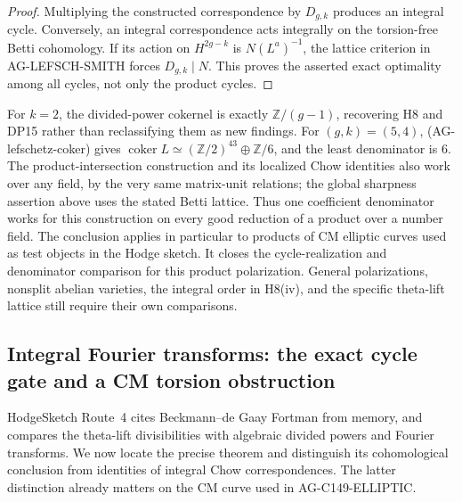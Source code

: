 \begin{proof}
Multiplying the constructed correspondence by $D_{g,k}$
produces an integral cycle.  Conversely, an integral
correspondence acts integrally on the torsion-free Betti
cohomology.  If its action on $H^{2g-k}$ is
$N(L^a)^{-1}$, the lattice criterion in AG-LEFSCH-SMITH
forces $D_{g,k}\mid N$.  This proves the asserted exact
optimality among all cycles, not only the product cycles.
\end{proof}

For $k=2$, the divided-power cokernel is exactly
$\mathbb Z/(g-1)$, recovering H8 and DP15 rather than
reclassifying them as new findings.  For $(g,k)=(5,4)$,
(AG-lefschetz-coker) gives
$\operatorname{coker} L\simeq(\mathbb Z/2)^{43}\oplus
\mathbb Z/6$, and the least denominator is $6$.
The product-intersection construction and its localized Chow
identities also work over any field, by the very same matrix-unit
relations; the global sharpness assertion above uses the stated
Betti lattice.  Thus one coefficient denominator works for this
construction on every good reduction of a product over a number
field.  The conclusion applies in particular to products
of CM elliptic curves used as test objects in the Hodge
sketch.  It closes the cycle-realization and denominator
comparison for this product polarization.  General
polarizations, nonsplit abelian varieties, the integral
order in H8(iv), and the specific theta-lift lattice still
require their own comparisons.


\subsection{Integral Fourier transforms: the exact cycle gate and a CM torsion obstruction}
\label{ag:fourier-cycle-gate}

HodgeSketch Route~4 cites Beckmann--de Gaay Fortman from memory,
and compares the theta-lift divisibilities with algebraic divided
powers and Fourier transforms.  We now locate the precise theorem
and distinguish its cohomological conclusion from identities of
integral Chow correspondences.  The latter distinction already
matters on the CM curve used in AG-C149-ELLIPTIC.

